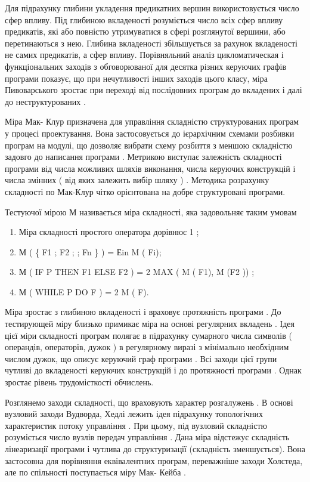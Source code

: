 Для підрахунку глибини укладення предикатних вершин використовується число сфер впливу. Під глибиною вкладеності розуміється число всіх сфер впливу предикатів, які або повністю утримуватися в сфері розглянутої вершини, або перетинаються з нею. Глибина вкладеності збільшується за рахунок вкладеності не самих предикатів, а сфер впливу. Порівняльний аналіз цикломатическая і функціональних заходів з обговорюваної для десятка різних керуючих графів програми показує, що при нечутливості інших заходів цього класу, міра Пивоварського зростає при переході від послідовних програм до вкладених і далі до неструктурованих .

Міра Мак- Клур призначена для управління складністю структурованих програм у процесі проектування. Вона застосовується до ієрархічним схемами розбивки програм на модулі, що дозволяє вибрати схему розбиття з меншою складністю задовго до написання програми . Метрикою виступає залежність складності програми від числа можливих шляхів виконання, числа керуючих конструкцій і числа змінних ( від яких залежить вибір шляху ) . Методика розрахунку складності по Мак-Клур чітко орієнтована на добре структуровані програми.

Тестуючої мірою М називається міра складності, яка задовольняє таким умовам
\begin{enumerate}
\item {} 
Міра складності простого оператора дорівнює 1 ;

\item {} 
М ( \{ F1 ; F2 ;  ; Fn \} ) = Еin M ( Fi);

\item {} 
М ( IF P THEN F1 ELSE F2 ) = 2 MAX ( M ( F1), M (F2 )) ;

\item {} 
М ( WHILE P DO F ) = 2 M ( F).

\end{enumerate}

Міра зростає з глибиною вкладеності і враховує протяжність програми . До тестирующей міру близько примикає міра на основі регулярних вкладень . Ідея цієї міри складності програм полягає в підрахунку сумарного числа символів ( операндів, операторів, дужок ) в регулярному виразі з мінімально необхідним числом дужок, що описує керуючий граф програми . Всі заходи цієї групи чутливі до вкладеності керуючих конструкцій і до протяжності програми . Однак зростає рівень трудомісткості обчислень.

Розглянемо заходи складності, що враховують характер розгалужень . В основі вузловий заходи Вудворда, Хедлі лежить ідея підрахунку топологічних характеристик потоку управління . При цьому, під вузловий складністю розуміється число вузлів передач управління . Дана міра відстежує складність лінеаризації програми і чутлива до структуризації (складність зменшується). Вона застосовна для порівняння еквівалентних програм, переважніше заходи Холстеда, але по спільності поступається міру Мак- Кейба .

